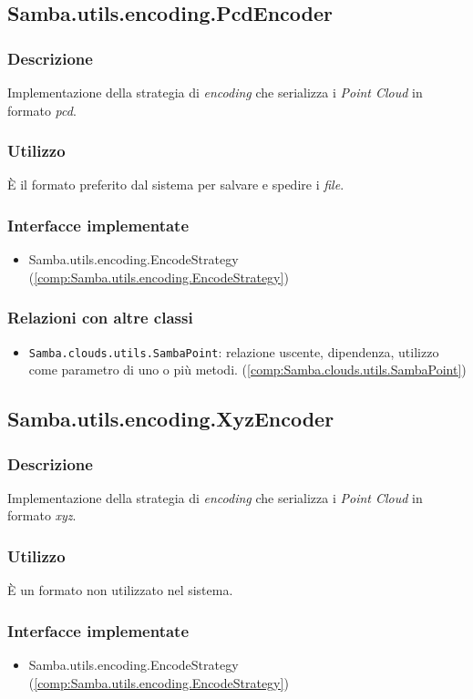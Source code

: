 \subsection{Samba.utils.encoding.PcdEncoder}\label{comp:Samba.utils.encoding.PcdEncoder}
\subsubsection{Descrizione}
Implementazione della strategia di \emph{encoding} che serializza i \emph{Point Cloud} in formato \emph{pcd}.
\subsubsection{Utilizzo}
È il formato preferito dal sistema per salvare e spedire i \emph{file}.
\subsubsection{Interfacce implementate}
\begin{itemize}
	\item Samba.utils.encoding.EncodeStrategy (\ref{comp:Samba.utils.encoding.EncodeStrategy})
\end{itemize}
\subsubsection{Relazioni con altre classi}
\begin{itemize}
	\item \texttt{Samba.clouds.utils.SambaPoint}: relazione uscente, dipendenza, utilizzo come parametro di uno o più metodi. (\ref{comp:Samba.clouds.utils.SambaPoint})
\end{itemize}

\subsection{Samba.utils.encoding.XyzEncoder}\label{comp:Samba.utils.encoding.XyzEncoder}
\subsubsection{Descrizione}
Implementazione della strategia di \emph{encoding} che serializza i \emph{Point Cloud} in formato \emph{xyz}.
\subsubsection{Utilizzo}
È un formato non utilizzato nel sistema.
\subsubsection{Interfacce implementate}
\begin{itemize}
	\item Samba.utils.encoding.EncodeStrategy (\ref{comp:Samba.utils.encoding.EncodeStrategy})
\end{itemize}
